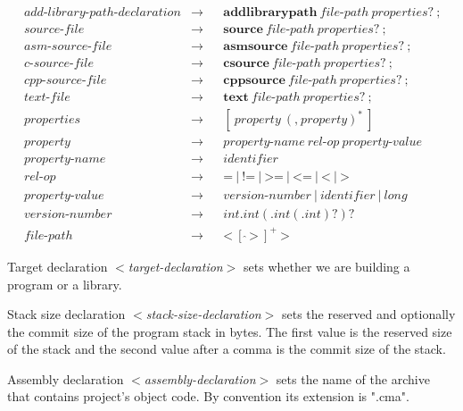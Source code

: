 \documentclass[a4paper,oneside,11pt]{article}
\begin{document}
\begin{align*}
add\textrm{-}library\textrm{-}path\textrm{-}declaration &\rightarrow & &\textbf{addlibrarypath} \> file\textrm{-}path \> properties? \> \texttt{;}\\
source\textrm{-}file &\rightarrow & &\textbf{source} \> file\textrm{-}path \> properties? \> \texttt{;}\\
asm\textrm{-}source\textrm{-}file &\rightarrow & &\textbf{asmsource} \> file\textrm{-}path \> properties? \> \texttt{;}\\
c\textrm{-}source\textrm{-}file &\rightarrow & &\textbf{csource} \> file\textrm{-}path \> properties? \> \texttt{;}\\
cpp\textrm{-}source\textrm{-}file &\rightarrow & &\textbf{cppsource} \> file\textrm{-}path \> properties? \> \texttt{;}\\
text\textrm{-}file &\rightarrow & &\textbf{text} \> file\textrm{-}path \> properties? \> \texttt{;}\\
properties &\rightarrow & &[ \> property \> (\texttt{,} \> property)^* \> ]\\
property &\rightarrow & &property\textrm{-}name \> rel\textrm{-}op \> property\textrm{-}value\\
property\textrm{-}name &\rightarrow & &\hyperref[identifier]{identifier}\\
rel\textrm{-}op &\rightarrow & &\texttt{=} \> | \> \texttt{!=} \> | \> \texttt{>=} \> | \> \texttt{<=} \> | \> \texttt{<} \> | \> \texttt{>}\\
property\textrm{-}value &\rightarrow & &version\textrm{-}number \> | \> \hyperref[identifier]{identifier} \> | \> long\\
version\textrm{-}number &\rightarrow & &int \texttt{.} int (\texttt{.} int (\texttt{.} int)?)?\\
file\textrm{-}path &\rightarrow & &\texttt{<} \> [\> \hat{}\,\texttt{>}\>]^+ \> \texttt{>}
\end{align*}

Target declaration \emph{$<$target-declaration$>$} sets whether we are building a program or a library.

Stack size declaration \emph{$<$stack-size-declaration$>$} sets the reserved and optionally the commit size
of the program stack in bytes.
The first value is the reserved size of the stack and the second value after a comma is the commit size of the stack.

Assembly declaration \emph{$<$assembly-declaration$>$} sets the name of the archive that contains project's object code.
By convention its extension is ".cma".
\end{document}
